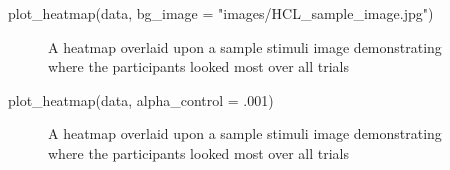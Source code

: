 \documentclass[
  man,
  floatsintext,
  longtable,
  nolmodern,
  notxfonts,
  notimes,
  colorlinks=true,linkcolor=blue,citecolor=blue,urlcolor=blue]{apa7}
\newenvironment{Shaded}{\begin{snugshade}}{\end{snugshade}}
\newcommand{\AttributeTok}[1]{\textcolor[rgb]{0.40,0.45,0.13}{#1}}
\newcommand{\DecValTok}[1]{\textcolor[rgb]{0.68,0.00,0.00}{#1}}
\newcommand{\FunctionTok}[1]{\textcolor[rgb]{0.28,0.35,0.67}{#1}}
\newcommand{\NormalTok}[1]{\textcolor[rgb]{0.00,0.23,0.31}{#1}}
\newcommand{\StringTok}[1]{\textcolor[rgb]{0.13,0.47,0.30}{#1}}
\begin{document}
\begin{Shaded}
\begin{Highlighting}[]
\FunctionTok{plot\_heatmap}\NormalTok{(data, }\AttributeTok{bg\_image =} \StringTok{"images/HCL\_sample\_image.jpg"}\NormalTok{)}
\end{Highlighting}
\end{Shaded}

\begin{figure}[H]

\caption{\label{fig-heatmap}A heatmap overlaid upon a sample stimuli
image demonstrating where the participants looked most over all trials}


\end{figure}%

\begin{Shaded}
\begin{Highlighting}[]
\FunctionTok{plot\_heatmap}\NormalTok{(data, }\AttributeTok{alpha\_control =}\NormalTok{ .}\DecValTok{001}\NormalTok{)}
\end{Highlighting}
\end{Shaded}

\begin{figure}[H]

\caption{\label{fig-heatmap-alpha-update}A heatmap overlaid upon a
sample stimuli image demonstrating where the participants looked most
over all trials}


\end{figure}%
\end{document}
